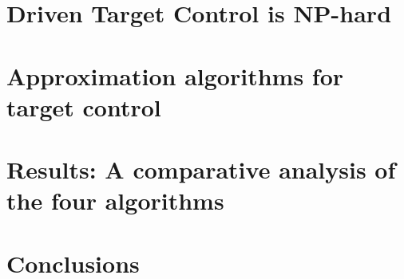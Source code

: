 \documentclass[oribibl]{llncs}
\begin{document}
%



\section{Driven Target Control is NP-hard}
%



\section{Approximation algorithms for target control}
%



\section{Results: A comparative analysis of the four algorithms}\label{results}






\section {Conclusions}


\end{document}

